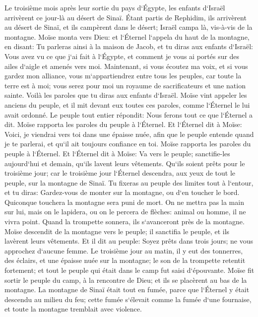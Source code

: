 \verse Le troisième mois après leur sortie du pays d`Égypte, les enfants d`Israël arrivèrent ce jour-là au désert de Sinaï. 
\verse Étant partis de Rephidim, ils arrivèrent au désert de Sinaï, et ils campèrent dans le désert; Israël campa là, vis-à-vis de la montagne. 
\verse Moïse monta vers Dieu: et l`Éternel l`appela du haut de la montagne, en disant: Tu parleras ainsi à la maison de Jacob, et tu diras aux enfants d`Israël: 
\verse Vous avez vu ce que j`ai fait à l`Égypte, et comment je vous ai portés sur des ailes d`aigle et amenés vers moi. 
\verse Maintenant, si vous écoutez ma voix, et si vous gardez mon alliance, vous m`appartiendrez entre tous les peuples, car toute la terre est à moi; 
\verse vous serez pour moi un royaume de sacrificateurs et une nation sainte. Voilà les paroles que tu diras aux enfants d`Israël. 
\verse Moïse vint appeler les anciens du peuple, et il mit devant eux toutes ces paroles, comme l`Éternel le lui avait ordonné. 
\verse Le peuple tout entier répondit: Nous ferons tout ce que l`Éternel a dit. Moïse rapporta les paroles du peuple à l`Éternel. 
\verse Et l`Éternel dit à Moïse: Voici, je viendrai vers toi dans une épaisse nuée, afin que le peuple entende quand je te parlerai, et qu`il ait toujours confiance en toi. Moïse rapporta les paroles du peuple à l`Éternel. 
\verse Et l`Éternel dit à Moïse: Va vers le peuple; sanctifie-les aujourd`hui et demain, qu`ils lavent leurs vêtements. 
\verse Qu`ils soient prêts pour le troisième jour; car le troisième jour l`Éternel descendra, aux yeux de tout le peuple, sur la montagne de Sinaï. 
\verse Tu fixeras au peuple des limites tout à l`entour, et tu diras: Gardez-vous de monter sur la montagne, ou d`en toucher le bord. Quiconque touchera la montagne sera puni de mort. 
\verse On ne mettra pas la main sur lui, mais on le lapidera, ou on le percera de flèches: animal ou homme, il ne vivra point. Quand la trompette sonnera, ils s`avanceront près de la montagne. 
\verse Moïse descendit de la montagne vers le peuple; il sanctifia le peuple, et ils lavèrent leurs vêtements. 
\verse Et il dit au peuple: Soyez prêts dans trois jours; ne vous approchez d`aucune femme. 
\verse Le troisième jour au matin, il y eut des tonnerres, des éclairs, et une épaisse nuée sur la montagne; le son de la trompette retentit fortement; et tout le peuple qui était dans le camp fut saisi d`épouvante. 
\verse Moïse fit sortir le peuple du camp, à la rencontre de Dieu; et ils se placèrent au bas de la montagne. 
\verse La montagne de Sinaï était tout en fumée, parce que l`Éternel y était descendu au milieu du feu; cette fumée s`élevait comme la fumée d`une fournaise, et toute la montagne tremblait avec violence. 
